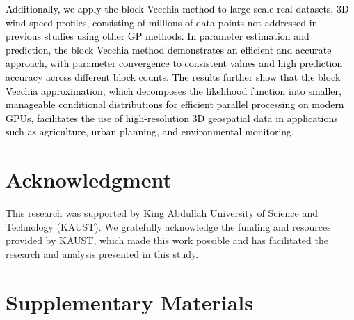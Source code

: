 \documentclass[12pt]{article}
\begin{document}
\textcolor{black}{
Additionally, we apply the block Vecchia method to large-scale real datasets, 3D wind speed profiles, consisting of millions of data points not addressed in previous studies using other GP methods. In parameter estimation and prediction, the block Vecchia method demonstrates an efficient and accurate approach, with parameter convergence to consistent values and high prediction accuracy across different block counts. The results further show that the block Vecchia approximation, which decomposes the likelihood function into smaller, manageable conditional distributions for efficient parallel processing on modern GPUs, facilitates the use of high-resolution 3D geospatial data in applications such as agriculture, urban planning, and environmental monitoring.
}


\section{Acknowledgment}

This research was supported by King Abdullah University of Science and Technology (KAUST). We gratefully acknowledge the funding and resources provided by KAUST, which made this work possible and has facilitated the research and analysis presented in this study.




\newpage
\setcounter{page}{1} %
\renewcommand{\thepage}{S\arabic{page}} %
\setcounter{figure}{0} %
\renewcommand{\thefigure}{S\arabic{figure}} %
\setcounter{table}{0} %
\renewcommand{\thetable}{S\arabic{table}} %


\appendix
\section*{Supplementary Materials}

\setcounter{subsection}{0}
\renewcommand{\thesubsection}{S\arabic{subsection}}
\end{document}
